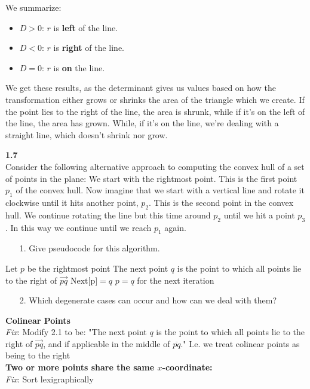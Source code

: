 We summarize:
\begin{itemize}
	\item $D > 0$: $r$ is \textbf{left} of the line.
	\item $D < 0$: $r$ is \textbf{right} of the line.
	\item $D = 0$: $r$ is \textbf{on} the line.
\end{itemize}

We get these results, as the determinant gives us values based on how the transformation either grows or shrinks the area of the triangle which we create. If the point lies to the right of the line, the area is shrunk, while if it's on the left of the line, the area has grown. While, if it's on the line, we're dealing with a straight line, which doesn't shrink nor grow.

\noindent
\textbf{1.7}\\
\noindent
Consider the following alternative approach to computing the convex hull of a set of points in the plane: We start with the rightmost point. This is the first point $p_{1}$ of the convex hull. Now imagine that we start with a vertical line and rotate it clockwise until it hits another point, $p_{2}$. This is the second point in the convex hull. We continue rotating the line but this time around $p_{2}$ until we hit a point $p_{3}$. In this way we continue until we reach $p_{1}$ again.

\begin{enumerate}
	\item[1.] Give pseudocode for this algorithm.
\end{enumerate}


\begin{algorithmic}
    \STATE Let $p$ be the rightmost point
        \STATE The next point $q$ is the point to which all points lie to the right of $\overrightarrow{pq}$
        \STATE $\text{Next[p]} = q$
        \STATE $p = q$ for the next iteration
    \ENDWHILE
\end{algorithmic}

\begin{enumerate}
	\item[2.] Which degenerate cases can occur and how can we deal with them?
\end{enumerate}
\textbf{Colinear Points}\\
\noindent
\textit{Fix}: Modify 2.1 to be: "The next point $q$ is the point to which all points lie to the right of $\overrightarrow{pq}$, and if applicable in the middle of $\overline{pq}$."
I.e. we treat colinear points as being to the right\\
\noindent
\textbf{Two or more points share the same $x$-coordinate:}\\
\noindent
\textit{Fix}: Sort lexigraphically


